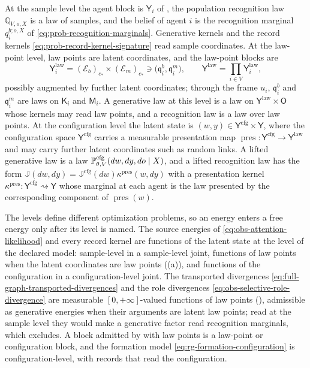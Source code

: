 At the sample level the agent block is $\mathsf Y_i$ of , the
population recognition law $\mathbb Q_{V,o,X}$ is a law of samples, and the belief of agent $i$ is the
recognition marginal $q_i^{b;o,X}$ of \eqref{eq:prob-recognition-marginals}. Generative kernels and the
record kernels \eqref{eq:prob-record-kernel-signature} read sample coordinates. At the law-point level, law
points are latent coordinates, and the law-point blocks are
\begin{equation}
\mathsf Y^{\mathrm{law}}_i=(\mathcal E_b)_{c_*}\times(\mathcal E_m)_{c_*}\ni\bigl(\mathfrak q_i^b,\mathfrak q_i^m\bigr),
\qquad
\mathsf Y^{\mathrm{law}}=\prod_{i\in V}\mathsf Y^{\mathrm{law}}_i,
\label{eq:prob-law-point-space}
\end{equation}
possibly augmented by further latent coordinates; through the frame $u_i$, $\mathfrak q_i^b$ and
$\mathfrak q_i^m$ are laws on $\mathsf K_i$ and $\mathsf M_i$. A generative law at this level is a law on
$\mathsf Y^{\mathrm{law}}\times\mathsf O$ whose kernels may read law points, and a recognition law is a law
over law points. At the configuration level the latent state is
$(w,y)\in\mathsf Y^{\mathrm{cfg}}\times\mathsf Y$, where the configuration space $\mathsf Y^{\mathrm{cfg}}$
carries a measurable presentation map
$\operatorname{pres}:\mathsf Y^{\mathrm{cfg}}\to\mathsf Y^{\mathrm{law}}$ and may carry further latent
coordinates such as random links. A lifted generative law is a law $\mathbb P^{\mathrm{cfg}}_{\theta,V}(dw,dy,do\mid X)$, and a lifted
recognition law has the form $\mathbb J(dw,dy)=\mathbb J^{\mathrm{cfg}}(dw)\kappa^{\mathrm{pres}}(w,dy)$ with a
presentation kernel $\kappa^{\mathrm{pres}}:\mathsf Y^{\mathrm{cfg}}\rightsquigarrow\mathsf Y$ whose marginal
at each agent is the law presented by the corresponding component of $\operatorname{pres}(w)$.

The levels define different optimization problems, so an energy enters a free energy only after its level
is named. The source energies of \eqref{eq:obs-attention-likelihood} and every record kernel are
functions of the latent state at the level of the declared model: sample-level in a sample-level joint,
functions of law points when the latent coordinates are law points ((a)),
and functions of the configuration in a configuration-level joint. The transported divergences \eqref{eq:full-graph-transported-divergences} and the role
divergences \eqref{eq:obs-selective-role-divergence} are measurable $[0,+\infty]$-valued functions of law
points (), admissible as generative energies when their arguments
are latent law points; read at the sample level they would make a generative factor read recognition
marginals, which  excludes. A block admitted by  with
law points is a law-point or configuration block, and the formation model
\eqref{eq:rg-formation-configuration} is configuration-level, with records that read the configuration.

